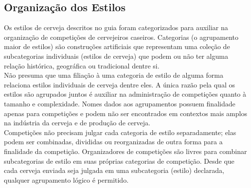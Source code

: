 \subsection*{Organização dos Estilos}
Os estilos de cerveja descritos no guia foram categorizados para auxiliar na organização de competições de cervejeiros caseiros. Categorias (o agrupamento maior de estilos) são construções artificiais que representam uma coleção de subcategorias individuais (estilos de cerveja) que podem ou não ter alguma relação histórica, geográfica ou tradicional dentre si.\\
Não presuma que uma filiação à uma categoria de estilo de alguma forma relaciona estilos individuais de cerveja dentre eles. A única razão pela qual os estilos são agrupados juntos é auxiliar na administração de competições quanto à tamanho e complexidade. Nomes dados aos agrupamentos possuem finalidade apenas para competições e podem não ser encontrados em contextos mais amplos na indústria da cerveja e de produção de cerveja.\\
Competições não precisam julgar cada categoria de estilo separadamente; elas podem ser combinadas, divididas ou reorganizadas de outra forma para a finalidade da competição. Organizadores de competições são livres para combinar subcategorias de estilo em suas próprias categorias de competição. Desde que cada cerveja enviada seja julgada em uma subcategoria (estilo) declarada, qualquer agrupamento lógico é permitido.
